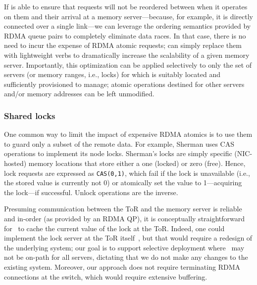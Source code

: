 If {\sword} is able to ensure that requests will not be reordered between when
it operates on them and their arrival at a memory server---because, for example,
it is directly connected over a single link---we can leverage the ordering
semantics provided by RDMA queue pairs to completely eliminate data races.
In that case, there is no need to incur the expense of RDMA atomic
requests; {\sword} can simply replace them with lightweight verbs to
dramatically increase the scalability of a given memory server.
Importantly, this optimization can be applied selectively to only the
set of servers (or memory ranges, i.e., locks) for which {\sword} is
suitably located and sufficiently provisioned to manage; atomic
operations destined for other servers and/or memory addresses can be
left unmodified.

\subsubsection{Shared locks}
\label{sec:locking-algorithm}

One common way to limit the impact of expensive RDMA atomics is to use
them to guard only a subset of the remote data.  For example, Sherman
uses CAS operations to implement its node locks.
%
Sherman's locks are simply specific (NIC-hosted) memory locations
that store either a one (locked) or zero (free).  Hence, lock requests
are expressed as \texttt{CAS(0,1)}, which fail if the lock is
unavailable (i.e., the stored value is currently not 0) or atomically
set the value to 1---acquiring the lock---if successful. Unlock
operations are the inverse.

Presuming communication between the ToR and the memory server is
reliable and in-order (as provided by an RDMA QP), it is conceptually
straightforward for \sword\ to cache the current value of the lock at
the ToR.  Indeed, one could implement the lock server at the ToR
itself~\cite{netlock}, but that would require a redesign of the
underlying system; our goal is to support selective deployment where
\sword\ may not be on-path for all servers, dictating that we do not
make any changes to the existing system.  Moreover, our approach does
not require terminating RDMA connections at the switch, which would
require extensive buffering.

